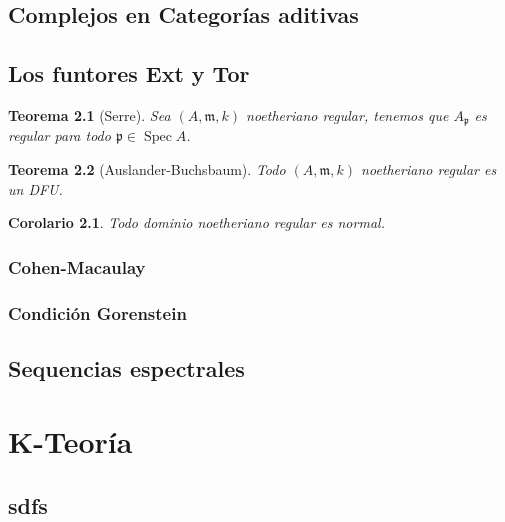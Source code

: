 \documentclass[12pt]{book}
\newtheorem{teo}{Teorema}
\newtheorem{cor}{Corolario}
\begin{document}
\chapter{Complejos en Categorías aditivas}



\chapter{Los funtores Ext y Tor}

\begin{teo}[Serre]
Sea $(A, \mathfrak{m},k)$ noetheriano regular, tenemos que $A_\mathfrak{p}$ es regular para todo $\mathfrak{p} \in \operatorname{Spec}A$.
\end{teo}

\begin{teo}[Auslander-Buchsbaum]
Todo $(A, \mathfrak{m},k)$ noetheriano regular es un DFU.
\end{teo}


\begin{cor}
Todo dominio noetheriano regular es normal.
\end{cor}



\section{Cohen-Macaulay}

\section{Condición Gorenstein}



\chapter{Sequencias espectrales}





\part{K-Teoría}

\chapter{sdfs}
\end{document}
